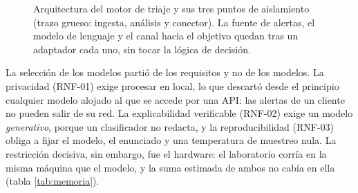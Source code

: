 \begin{figure}[htbp]
\centering
\shorthandoff{>}%
\shorthandon{>}%
\caption[Arquitectura del motor de triaje]{Arquitectura del motor de triaje y sus tres puntos de
aislamiento (trazo grueso: ingesta, análisis y conector). La fuente de alertas, el modelo de lenguaje
y el canal hacia el objetivo quedan tras un adaptador cada uno, sin tocar la lógica de decisión.}
\label{fig:arquitectura}
\end{figure}

La selección de los modelos partió de los requisitos y no de los modelos. La privacidad (RNF-01)
exige procesar en local, lo que descartó desde el principio cualquier modelo alojado al que se
accede por una API: las alertas de un cliente no pueden salir de su red. La explicabilidad
verificable (RNF-02) exige un modelo \emph{generativo}, porque un clasificador no redacta, y la
reproducibilidad (RNF-03) obliga a fijar el modelo, el enunciado y una temperatura de muestreo nula.
La restricción decisiva, sin embargo, fue el hardware: el laboratorio corría en la misma máquina que
el modelo, y la suma estimada de ambos no cabía en ella (tabla \ref{tab:memoria}).

